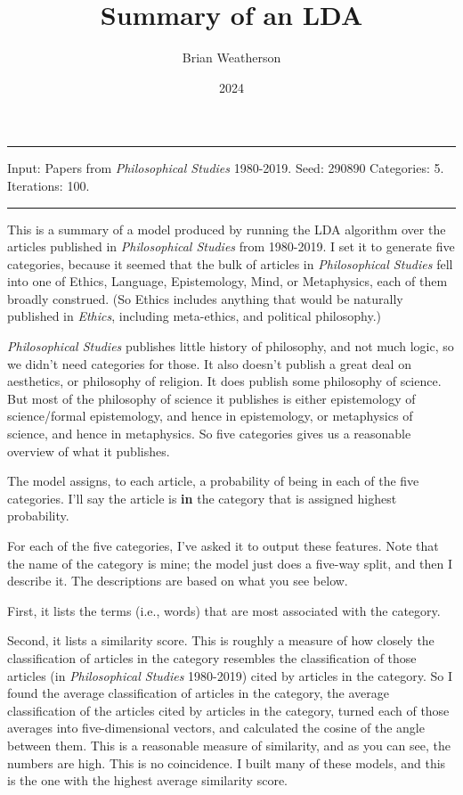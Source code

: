 \documentclass[
  10pt,
  letterpaper,
  DIV=11,
  numbers=noendperiod,
  twoside]{scrartcl}
\title{Summary of an LDA}
\author{Brian Weatherson}
\date{2024}
\renewenvironment{abstract}
 {\vspace{-1.25cm}
 \quotation\small\noindent\rule{\linewidth}{.5pt}\par\smallskip
 \noindent }
 {\par\noindent\rule{\linewidth}{.5pt}\endquotation}
\begin{document}
\maketitle
\begin{abstract}
Input: Papers from \emph{Philosophical Studies} 1980-2019. Seed: 290890
Categories: 5. Iterations: 100.
\end{abstract}


This is a summary of a model produced by running the LDA algorithm over
the articles published in \emph{Philosophical Studies} from 1980-2019. I
set it to generate five categories, because it seemed that the bulk of
articles in \emph{Philosophical Studies} fell into one of Ethics,
Language, Epistemology, Mind, or Metaphysics, each of them broadly
construed. (So Ethics includes anything that would be naturally
published in \emph{Ethics}, including meta-ethics, and political
philosophy.)

\emph{Philosophical Studies} publishes little history of philosophy, and
not much logic, so we didn't need categories for those. It also doesn't
publish a great deal on aesthetics, or philosophy of religion. It does
publish some philosophy of science. But most of the philosophy of
science it publishes is either epistemology of science/formal
epistemology, and hence in epistemology, or metaphysics of science, and
hence in metaphysics. So five categories gives us a reasonable overview
of what it publishes.

The model assigns, to each article, a probability of being in each of
the five categories. I'll say the article is \textbf{in} the category
that is assigned highest probability.

For each of the five categories, I've asked it to output these features.
Note that the name of the category is mine; the model just does a
five-way split, and then I describe it. The descriptions are based on
what you see below.

First, it lists the terms (i.e., words) that are most associated with
the category.

Second, it lists a similarity score. This is roughly a measure of how
closely the classification of articles in the category resembles the
classification of those articles (in \emph{Philosophical Studies}
1980-2019) cited by articles in the category. So I found the average
classification of articles in the category, the average classification
of the articles cited by articles in the category, turned each of those
averages into five-dimensional vectors, and calculated the cosine of the
angle between them. This is a reasonable measure of similarity, and as
you can see, the numbers are high. This is no coincidence. I built many
of these models, and this is the one with the highest average similarity
score.
\end{document}
